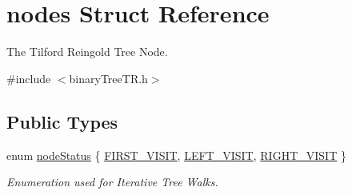 \hypertarget{structnodes}{}\section{nodes Struct Reference}
\label{structnodes}


The Tilford Reingold Tree Node.  




{\ttfamily \#include $<$binary\+Tree\+T\+R.\+h$>$}

\subsection*{Public Types}
\begin{DoxyCompactItemize}
\item 
enum \hyperlink{structnodes_aab296cc56fa34a05b7d9d632a9ddef2a}{node\+Status} \{ \hyperlink{structnodes_aab296cc56fa34a05b7d9d632a9ddef2aa06e3b7a26e3c03ded9d4cdc0eed59c89}{F\+I\+R\+S\+T\+\_\+\+V\+I\+S\+IT}, 
\hyperlink{structnodes_aab296cc56fa34a05b7d9d632a9ddef2aa66d47edf0c9c518208ba4418992a2423}{L\+E\+F\+T\+\_\+\+V\+I\+S\+IT}, 
\hyperlink{structnodes_aab296cc56fa34a05b7d9d632a9ddef2aa27c051da4e0422f702020cee7406b441}{R\+I\+G\+H\+T\+\_\+\+V\+I\+S\+IT}
 \}\begin{DoxyCompactList}\small\item\em Enumeration used for Iterative Tree Walks. \end{DoxyCompactList}
\end{DoxyCompactItemize}

